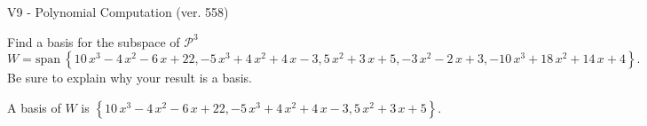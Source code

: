 \begin{exercise}
  \begin{exerciseTitle}V9 - Polynomial Computation (ver. 558)\end{exerciseTitle}
  \begin{exerciseStatement}
    Find a basis for the subspace of \(\mathcal{P}^3\) 
\[W=\mathrm{span}\ \left\{10 \, x^{3} - 4 \, x^{2} - 6 \, x + 22 , -5 \, x^{3} + 4 \, x^{2} + 4 \, x - 3 , 5 \, x^{2} + 3 \, x + 5 , -3 \, x^{2} - 2 \, x + 3 , -10 \, x^{3} + 18 \, x^{2} + 14 \, x + 4\right\}.\]
 Be sure to explain why your result is a basis.


  \end{exerciseStatement}
  \begin{exerciseAnswer}
   A basis of \(W\) is  \(\left\{10 \, x^{3} - 4 \, x^{2} - 6 \, x + 22 , -5 \, x^{3} + 4 \, x^{2} + 4 \, x - 3 , 5 \, x^{2} + 3 \, x + 5\right\}\).
  


  \end{exerciseAnswer}
\end{exercise}